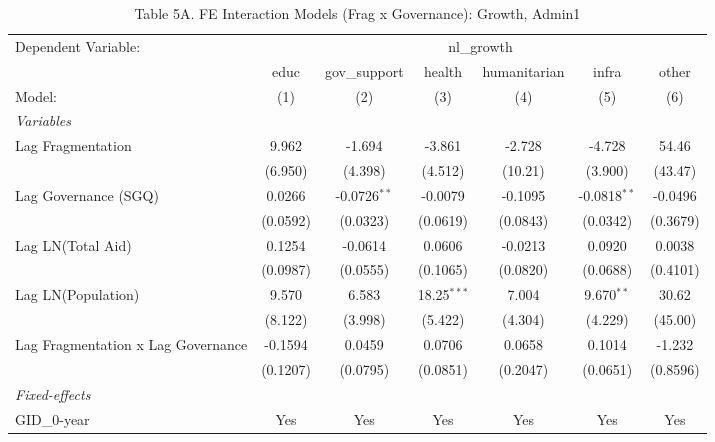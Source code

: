 \begin{table}[H]
   \caption{Table 5A. FE Interaction Models (Frag x Governance): Growth, Admin1}
   \centering
   \begin{tabular}{lcccccc}
      \tabularnewline \midrule \midrule
      Dependent Variable: & \multicolumn{6}{c}{nl\_growth}\\
                                         & educ     & gov\_support   & health        & humanitarian & infra          & other \\   
      Model:                             & (1)      & (2)            & (3)           & (4)          & (5)            & (6)\\  
      \midrule
      \emph{Variables}\\
      Lag Fragmentation                  & 9.962    & -1.694         & -3.861        & -2.728       & -4.728         & 54.46\\   
                                         & (6.950)  & (4.398)        & (4.512)       & (10.21)      & (3.900)        & (43.47)\\   
      Lag Governance (SGQ)               & 0.0266   & -0.0726$^{**}$ & -0.0079       & -0.1095      & -0.0818$^{**}$ & -0.0496\\   
                                         & (0.0592) & (0.0323)       & (0.0619)      & (0.0843)     & (0.0342)       & (0.3679)\\   
      Lag LN(Total Aid)                  & 0.1254   & -0.0614        & 0.0606        & -0.0213      & 0.0920         & 0.0038\\   
                                         & (0.0987) & (0.0555)       & (0.1065)      & (0.0820)     & (0.0688)       & (0.4101)\\   
      Lag LN(Population)                 & 9.570    & 6.583          & 18.25$^{***}$ & 7.004        & 9.670$^{**}$   & 30.62\\   
                                         & (8.122)  & (3.998)        & (5.422)       & (4.304)      & (4.229)        & (45.00)\\   
      Lag Fragmentation x Lag Governance & -0.1594  & 0.0459         & 0.0706        & 0.0658       & 0.1014         & -1.232\\   
                                         & (0.1207) & (0.0795)       & (0.0851)      & (0.2047)     & (0.0651)       & (0.8596)\\   
      \midrule
      \emph{Fixed-effects}\\
      GID\_0-year                        & Yes      & Yes            & Yes           & Yes          & Yes            & Yes\\  

\end{tabular}
\end{table}
